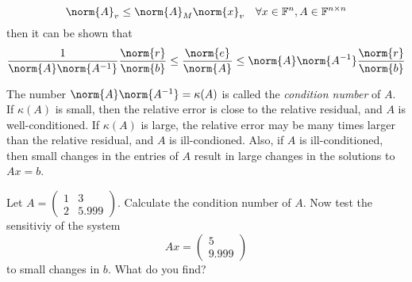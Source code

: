 \begin{equation} \label{eq:normcondition}
\norm{A}_v \leq \norm{A}_M\norm{x}_v \quad \forall x \in  \mathbb{F}^n, A \in \mathbb{F}^{n \times n}
\end{equation}
then it can be shown that 
\begin{equation*}
\frac{1}{\norm{A} \norm{A^{-1}}} \frac{\norm{r}}{\norm{b}} \leq \frac{\norm{e}}{\norm{A}} \leq \norm{A} \norm{A^{-1}} \frac{\norm{r}}{\norm{b}}
\end{equation*}

The number $\norm{A} \norm{A^{-1}} = \kappa (A)$ is called the \emph{condition number} of $A$. If $\kappa (A)$ is small, then the relative error is close to the relative residual, and $A$ is well-conditioned. If $\kappa (A)$ is large, the relative error may be many times larger than the relative residual, and $A$ is ill-condioned. Also, if $A$ is ill-conditioned, then small changes in the entries of $A$ result in large changes in the solutions to $Ax = b$. 

\begin{problem}
Let $A =\begin{pmatrix}1 & 3\\2 & 5.999\end{pmatrix}$. Calculate the condition number of $A$. Now test the sensitiviy of the system
\begin{equation*}
A x= \begin{pmatrix}5\\9.999\end{pmatrix}
\end{equation*}
to small changes in $b$. What do you find?
\end{problem}

